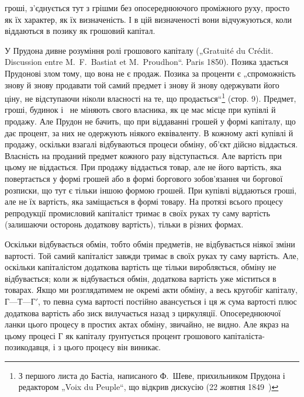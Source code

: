 \parcont{}  %
гроші, з’єднується тут з грішми без опосереднюючого проміжного
руху, просто як їх характер, як їх визначеність. І в цій
визначеності вони відчужуються, коли віддаються в позику як
грошовий капітал.

\disablefootnotebreak{}
У Прудона дивне розуміння ролі грошового капіталу („Gratuité
du Crédit. Discussion entre M.~F.~Bastiat et M.~Proudhon“.
Paris 1850). Позика здається Прудонові злом тому, що вона не
є продаж. Позика за проценти є „спроможність знову й знову продавати
той самий предмет і знову й знову одержувати його ціну,
не відступаючи ніколи власності на те, що продається“\footnote*{
З першого листа до Бастіа, написаного Ф.~Шеве, прихильником Прудона
і редактором „Voix du Peuple“, що відкрив дискусію (22 жовтня 1849~) 
} (стор. 9).
Предмет, гроші, будинок і~ не міняють свого власника, як
це має місце при купівлі й продажу. Але Прудон не бачить,
що при віддаванні грошей у формі капіталу, що дає процент, за
них не одержують ніякого еквіваленту. В кожному акті купівлі
й продажу, оскільки взагалі відбуваються процеси обміну, об’єкт
дійсно віддається. Власність на проданий предмет кожного разу
відступається. Але вартість при цьому не віддається. При продажу
віддається товар, але не його вартість, яка повертається
у формі грошей або в формі боргового зобов’язання чи боргової
розписки, що тут є тільки іншою формою грошей. При купівлі віддаються
гроші, але не їх вартість, яка заміщається в формі товару.
На протязі всього процесу репродукції промисловий капіталіст
тримає в своїх руках ту саму вартість (залишаючи
осторонь додаткову вартість), тільки в різних формах.
\enablefootnotebreak{}

Оскільки відбувається обмін, тобто обмін предметів, не відбувається
ніякої зміни вартості. Той самий капіталіст завжди
тримає в своїх руках ту саму вартість. Але, оскільки капіталістом
додаткова вартість ще тільки виробляється, обміну не відбувається;
коли ж відбувається обмін, додаткова вартість уже
міститься в товарах. Якщо ми розглядатимем не окремі акти
обміну, а весь кругобіг капіталу, $Г — Т — Г'$, то певна сума вартості
постійно авансується і ця ж сума вартості плюс додаткова вартість
або зиск вилучається назад з циркуляції. Опосереднюючої
ланки цього процесу в простих актах обміну, звичайно, не видно.
Але якраз на цьому процесі $Г$ як капіталу ґрунтується процент
грошового капіталіста-позикодавця, і з цього процесу він
виникає.

